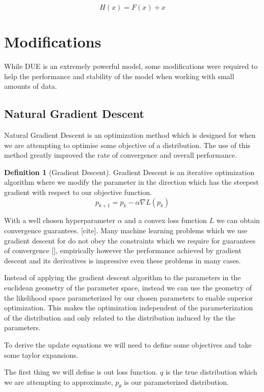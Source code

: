 \documentclass[12pt, a4paper]{report}
\theoremstyle{definition}
\theoremstyle{definition}
\newtheorem{definition}{Definition}[section]
\theoremstyle{definition}
\begin{document}
$$H(x) = F(x) + x$$


\section{Modifications}

While DUE is an extremely powerful model, some modifications were required to help the performance and stability of the model when working with small amounts of data. 

\subsection{Natural Gradient Descent}

Natural Gradient Descent is an optimization method which is designed for when we are attempting to optimise some objective of a distribution. The use of this method greatly improved the rate of convergence and overall performance. \cite{NGD}


\begin{definition}[Gradient Descent]
    Gradient Descent is an iterative optimization algorithm where we modify the parameter in the direction which has the steepest gradient with respect to our objective function.
    $$p_{k+1} = p_{k} -  \alpha \nabla L(p_k)$$
\end{definition}

With a well chosen hyperparameter $\alpha$ and a convex loss function $L$ we can obtain convergence guarantees. [cite]. Many machine learning problems which we use gradient descent for do not obey the constraints which we require for guarantees of convergence [], empirically however the performance achieved by gradient descent and its derivatives is impressive even these problems in many cases.

Instead of applying the gradient descent algorithm to the parameters in the euclidean geometry of the parameter space, instead we can use the geometry of the likelihood space parameterized by our chosen parameters to enable superior optimization. This makes the optimization independent of the parameterization of the distribution and only related to the distribution induced by the the parameters.
 
To derive the update equations we will need to define some objectives and take some taylor expansions.

The first thing we will define is out loss function. $q$ is the true distribution which we are attempting to approximate, $p_\theta$ is our parameterized distribution.
\end{document}
